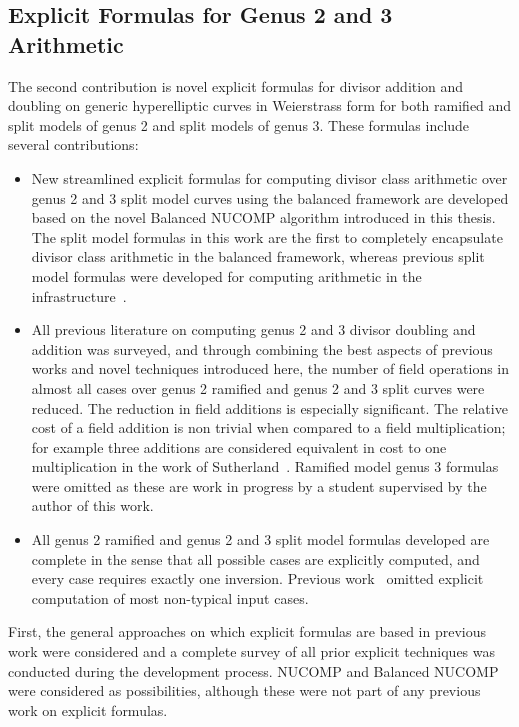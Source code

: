 \subsection{Explicit Formulas for Genus 2 and 3 Arithmetic}
The second contribution is novel explicit formulas for divisor addition and
doubling on generic hyperelliptic curves in Weierstrass form for both ramified
and split models of genus 2 and split models of genus 3. These formulas include
several contributions:
\begin{itemize}

    \item New streamlined explicit formulas for computing divisor class
    arithmetic over genus 2 and 3 split model curves using the balanced
    framework are developed based on the novel Balanced NUCOMP algorithm
    introduced in this thesis. The split model formulas in this work are the
    first to completely encapsulate divisor class arithmetic in the balanced
    framework, whereas previous split model formulas were developed for
    computing arithmetic in the
    infrastructure~\cite{EricksonJacobsonStein_realg2_2011, rad2019jacobian}.
    \item All previous literature on computing genus 2 and 3 divisor doubling
    and addition was surveyed, and through combining the best aspects of
    previous works and novel techniques introduced here, the number of field
    operations in almost all cases over genus 2 ramified and genus 2 and 3 split
    curves were reduced. The reduction in field additions is especially
    significant. The relative cost of a field addition is non trivial when
    compared to a field multiplication; for example three additions are
    considered equivalent in cost to one multiplication in the work of
    Sutherland~\cite{Sutherland_g3_2019}. Ramified model genus 3 formulas were
    omitted as these are work in progress by a student supervised by the author of this work. 
    \item All genus 2 ramified and genus 2 and 3 split model formulas developed
    are complete in the sense that all possible cases are explicitly computed,
    and every case requires exactly one inversion. Previous
    work~\cite{EricksonJacobsonStein_realg2_2011, rad2019jacobian,
    Sutherland_g3_2019} omitted explicit computation of most non-typical input
    cases. 
\end{itemize}

First, the general approaches on which explicit formulas are based in previous
work were considered  and a complete survey of all prior explicit techniques was
conducted during the development process. NUCOMP and Balanced NUCOMP were
considered as possibilities, although these were not part of any previous work
on explicit formulas.

